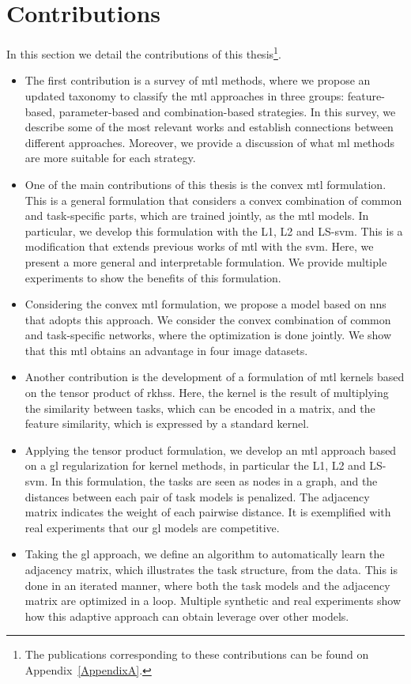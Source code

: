 \section{Contributions}
In this section we detail the contributions of this thesis\footnote{The publications corresponding to these contributions can be found on Appendix~\ref{AppendixA}.}.
\begin{itemize}
    \item The first contribution is a survey of \acrshort{mtl} methods, where we propose an updated taxonomy to classify the \acrshort{mtl} approaches in three groups: feature-based, parameter-based and combination-based strategies. In this survey, we describe some of the most relevant works and establish connections between different approaches. Moreover, we provide a discussion of what \acrshort{ml} methods are more suitable for each strategy.
    \item One of the main contributions of this thesis is the convex \acrshort{mtl} formulation. This is a general formulation that considers a convex combination of common and task-specific parts, which are trained jointly, as the \acrshort{mtl} models. In particular, we develop this formulation with the L1, L2 and LS-\acrshort{svm}. This is a modification that extends previous works of \acrshort{mtl} with the \acrshort{svm}. Here, we present a more general and interpretable formulation. We provide multiple experiments to show the benefits of this formulation.
    \item Considering the convex \acrshort{mtl} formulation, we propose a model based on \acrshort{nns} that adopts this approach. We consider the convex combination of common and task-specific networks, where the optimization is done jointly. We show that this \acrshort{mtl} obtains an advantage in four image datasets.
    \item Another contribution is the development of a formulation of \acrshort{mtl} kernels based on the tensor product of \acrshort{rkhss}. Here, the kernel is the result of multiplying the similarity between tasks, which can be encoded in a matrix, and the feature similarity, which is expressed by a standard kernel.%
    \item Applying the tensor product formulation, we develop an \acrshort{mtl} approach based on a \acrfull{gl} regularization for kernel methods, in particular the L1, L2 and LS-\acrshort{svm}. In this formulation, the tasks are seen as nodes in a graph, and the distances between each pair of task models is penalized. The adjacency matrix indicates the weight of each pairwise distance. It is exemplified with real experiments that our \acrshort{gl} models are competitive.
    \item Taking the \acrshort{gl} approach, we define an algorithm to automatically learn the adjacency matrix, which illustrates the task structure, from the data. This is done in an iterated manner, where both the task models and the adjacency matrix are optimized in a loop. Multiple synthetic and real experiments show how this adaptive approach can obtain leverage over other models.
\end{itemize}


